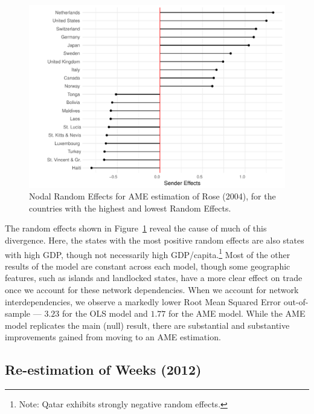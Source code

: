 \begin{figure}
	\includegraphics[width=\textwidth]{rose_aeff_top10.pdf}
	\caption{Nodal Random Effects for AME estimation of Rose (2004), for the countries with the highest and lowest Random Effects.}
	\label{fig:roser}
\end{figure}
\FloatBarrier

The random effects shown in Figure~\ref{fig:roser} reveal the cause of much of this divergence. Here, the states with the most positive random effects are also states with high GDP, though not necessarily high GDP/capita.\footnote{Note: Qatar exhibits strongly negative random effects.}  Most of the other results of the model are constant across each model, though some geographic features, such as islands and landlocked states, have a more clear effect on trade once we account for these network dependencies. When we account for network interdependencies, we observe a markedly lower Root Mean Squared Error out-of-sample --- $3.23$ for the OLS model and $1.77$ for the AME model. While the AME model replicates the main (null) result, there are substantial and substantive improvements gained from moving to an AME estimation.

\subsection{Re-estimation of Weeks (2012)}

